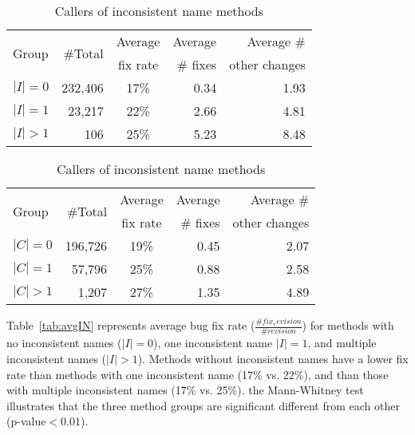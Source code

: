 \begin{table}[@{}ht]
 \begin{minipage}{.5\linewidth}
\begin{center}
\vspace{-4mm}
\caption{ Inconsistent name methods}
\label{tab:avgIN}
\scriptsize{
\begin{tabular}{@{}l|rcrr@{}}  
\multirow{2}{*}{Group} &\multirow{2}{*}{\#Total}&Average&Average&Average \# \\ 
&&fix rate&\# fixes&other changes\\ \midrule
$|I|=0$ &232,406&17\%&0.34&1.93\\
$|I|=1$ &23,217&22\% &2.66&4.81\\
$|I|>1$ &106& 25\% &5.23&8.48\\ 
\end{tabular}
}
\vspace{-6mm}
\end{center}
\end{minipage}
 \begin{minipage}{.5\linewidth}
 \begin{center}
\vspace{-4mm}
\caption{Callers of inconsistent name methods}
\label{tab:avgInvoke}
\vspace{1mm}
\scriptsize{
\begin{tabular}{l|rcrr}  
\multirow{2}{*}{Group} &\multirow{2}{*}{\#Total}&Average&Average&Average \# \\ 
&&fix rate&\# fixes&other changes\\ \midrule
$|C|=0$ &196,726& 19\% & 0.45&2.07\\
$|C|=1$&57,796&25\% &0.88&2.58\\
$|C|>1$&1,207& 27\% &1.35&4.89\\ 
\end{tabular}
}
\vspace{-6mm}
\end{center}
 \end{minipage}
\end{table}



Table~\ref{tab:avgIN} represents average bug fix rate ($\frac{\#fix_revision}{\#revision}$) for methods with no inconsistent names ($|I|=0$), one inconsistent name $|I|=1$, and multiple inconsistent names ($|I|>1$). Methods without inconsistent names have a lower fix rate than methods with one inconsistent name (17\% vs. 22\%), and than those with multiple inconsistent names (17\% vs. 25\%). the Mann-Whitney test illustrates that  the three method groups are significant different from  each other (p-value$<0.01$).

